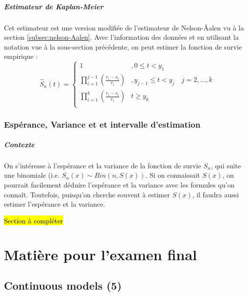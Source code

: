 \documentclass[12pt, french]{report}
\begin{document}
\subsubsection{Estimateur de Kaplan-Meier}
Cet estimateur est une version modifiée de l'estimateur de Nelson-\r{A}alen vu à la section \ref{subsec:nelson-Aalen}. Avec l'information des données et en utilisant la notation vue à la sous-section précédente, on peut estimer la fonction de survie empirique : 
\begin{equation}
\hat{S}_n(t) =
\begin{cases}
1		& , 0 \leq t < y_1 \\
\prod_{i=1}^{j-1} \left( \frac{r_i - s_i}{r_i} \right) & , y_{j-1} \leq t < y_j \quad j = 2, ..., k \\
\prod_{i=1}^{k} \left( \frac{r_i - s_i}{r_i}  \right) & t \geq y_k \\
\end{cases}
\end{equation}


\section{Espérance, Variance et et intervalle d'estimation}

\subsubsection{Contexte}
On s'intéresse à l'espérance et la variance de la fonction de survie $S_n$, qui suite une binomiale (i.e. $S_n(x) \sim Bin(n, S(x))$. Si on connaissait $S(x)$, on pourrait facilement déduire l'espérance et la variance avec les formules qu'on connaît. Toutefois, puisqu'on cherche souvent à estimer $S(x)$, il faudra aussi estimer l'espérance et la variance.

\hl{Section à compléter}



\part{Matière pour l'examen final}

\chapter{Continuous models (5)}
\end{document}
